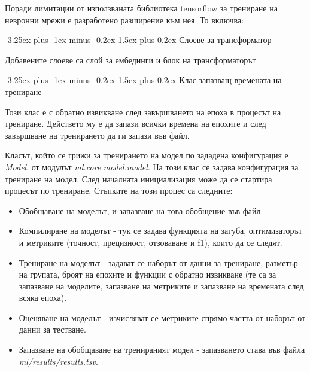 \documentclass{article}
\makeatletter
\newcounter{subsubsubsection}[subsubsection]
\renewcommand\paragraph{\@startsection{paragraph}{5}{\z@}%
{3.25ex \@plus1ex \@minus.2ex}%
{-1em}%
{\normalfont\normalsize\bfseries}}
\renewcommand{\paragraph}{\@startsection{paragraph}{4}{0ex}%
{-3.25ex plus -1ex minus -0.2ex}%
{1.5ex plus 0.2ex}%
{\normalfont\normalsize\bfseries}}
\makeatother
\begin{document}

Поради лимитации от използваната библиотека tensorflow за трениране на невронни мрежи е разработено разширение към нея.
То включва:

\paragraph{Слоеве за трансформатор}

Добавените слоеве са слой за ембединги и блок на трансформаторът.

\paragraph{Клас запазващ времената на трениране}

Този клас е с обратно извикване след завършването на епоха в процесът на трениране. Действето му е да запази всички
времена на епохите и след завършване на тренирането да ги запази във файл.


Класът, който се грижи за тренирането на модел по зададена конфигурация е \textit{Model}, от модулът
\textit{ml.core.model.model}. На този клас се задава конфигурация за трениране на модел. След началната инициализация
може да се стартира процесът по трениране. Стъпките на този процес са следните:

\begin{itemize}

\item Обобщаване на моделът, и запазване на това обобщение във файл.
\item Компилиране на моделът - тук се задава функцията на загуба, оптимизаторът и метриките (точност, прецизност,
отзоваване и f1), които да се следят.
\item Трениране на моделът - задават се наборът от данни за трениране, разметър на групата, броят на епохите и
функции с обратно извикване (те са за запазване на моделите, запазване на метриките и запазване на времената след
всяка епоха).
\item Оценяване на моделът - изчисляват се метриките спрямо частта от наборът от данни за тестване.
\item Запазване на обобщаване на тренираният модел - запазването става във файла \textit{ml/results/results.tsv}.

\end{itemize}
\end{document}
